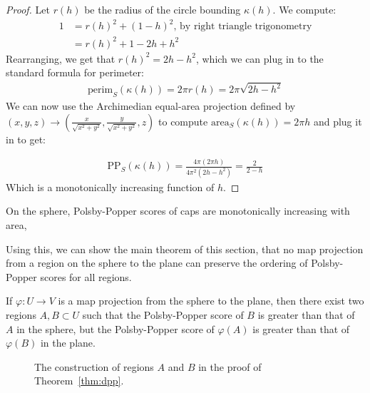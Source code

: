 \begin{proof}
  Let $r(h)$ be the radius of the circle bounding $\kappa(h)$. We
  compute: 
  \begin{align*}
    1 &= r(h)^2 + (1-h)^2 \text {, by right triangle trigonometry}\\ 
      &= r(h)^2 + 1 - 2h+h^2
  \end{align*}
  Rearranging, we get that $r(h)^2= 2h-h^2$, which we can plug in to
  the standard formula for perimeter:
  \begin{align*}
    \mathrm{perim}_S(\kappa(h)) = 2\pi r(h) = 2\pi \sqrt{2h-h^2}
  \end{align*}
  We can now use the Archimedian equal-area projection 
  defined by $(x,y,z) \to
  \left(\frac{x}{\sqrt{x^2+y^2}},\frac{y}{\sqrt{x^2+y^2}}, z\right)$ 
  to compute $\mathrm{area}_S(\kappa(h)) = 2\pi h$ and plug it in to 
  get:

  \begin{align*}
    \mathrm{PP}_S(\kappa(h)) = \frac{4\pi (2\pi h) }{4 \pi^2 (2h-h^2)}
    = \frac{2}{2-h}
  \end{align*}
  Which is a monotonically increasing function of $h$.
\end{proof}
\begin{corollary}\label{cor:capscale}
  On the sphere, Polsby-Popper scores of caps are monotonically
  increasing with area,
\end{corollary}
Using this, we can show the main theorem of this section, that no map
projection from a region on the sphere to the plane can preserve the ordering
of Polsby-Popper scores for all regions.  

\begin{theorem}\label{thm:dpp}
  If $\varphi:U\to V$ is a map projection from the sphere to the plane,
  then there exist two regions $A,B\subset U$ such that
  the Polsby-Popper score of $B$ is greater than that of $A$ in the
  sphere, but the Polsby-Popper score of $\varphi(A)$ is greater than
  that of $\varphi(B)$ in the plane.
\end{theorem}
\begin{figure}[h]
  \centering

  \caption{The construction of regions $A$ and $B$ in the
  proof of Theorem~\ref{thm:dpp}.} 
\label{fig:dpp}
\end{figure}


